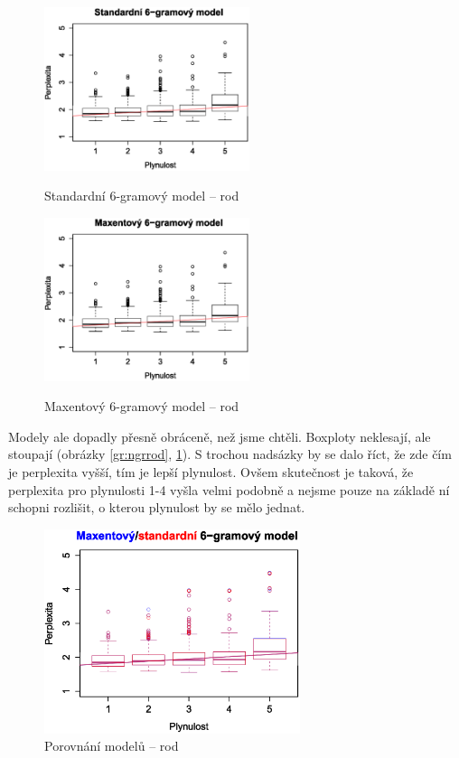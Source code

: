 \documentclass[12pt,a4paper]{report}
\begin{document}
\begin{figure}[!htb]
\begin{center}
  \centering\includegraphics[width=60mm]{./grafy/morf/ngram/rod.svg.eps}
  \caption{Standardní 6-gramový model -- rod}\label{gr:ngrrod}
\endminipage\quad
{}
  \centering\includegraphics[width=60mm]{./grafy/morf/maxent/rod.svg.eps}
  \caption{Maxentový 6-gramový model -- rod}\label{gr:maxrod}
\endminipage
\end{center}
\end{figure}

Modely ale dopadly přesně obráceně, než jsme chtěli. Boxploty neklesají, ale stoupají (obrázky \ref{gr:ngrrod}, \ref{gr:maxrod}). S trochou nadsázky by se dalo říct, že zde čím je perplexita vyšší, tím je lepší plynulost. Ovšem skutečnost je taková, že perplexita pro plynulosti 1-4 vyšla velmi podobně a nejsme pouze na základě ní schopni rozlišit, o kterou plynulost by se mělo jednat.





\begin{figure}[!htbp]
\begin{center}
	\centering
	\includegraphics[width=75mm]{./grafy/morf/porovnani/rod.svg.eps}	
	\caption{Porovnání modelů -- rod}\label{gr:porrod}
\endminipage
\end{center}
\end{figure}
\end{document}
